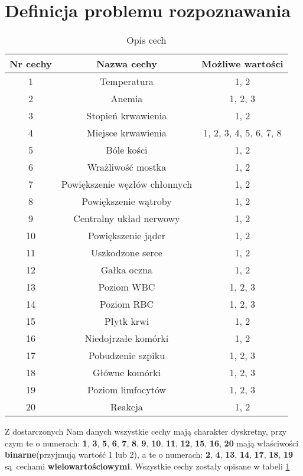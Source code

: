 \section{Definicja problemu rozpoznawania}
	
	\begin{table}[h!]
		\centering
		\begin{tabular}{|| c | c | c ||} 
			\hline
			Nr cechy & Nazwa cechy & Możliwe wartości \\ [0.5ex] 
			\hline\hline
			1 & Temperatura & 1, 2 \\ 
			2 & Anemia & 1, 2, 3 \\
			3 & Stopień krwawienia & 1, 2 \\
			4 & Miejsce krwawienia & 1, 2, 3, 4, 5, 6, 7, 8 \\
			5 & Bóle kości & 1, 2 \\
			6 & Wrażliwość mostka & 1, 2 \\
			7 & Powiększenie węzłów chłonnych & 1, 2 \\
			8 & Powiększenie wątroby & 1, 2 \\
			9 & Centralny układ nerwowy & 1, 2 \\
			10 & Powiększenie jąder & 1, 2 \\
			11 & Uszkodzone serce & 1, 2 \\
			12 & Gałka oczna & 1, 2 \\
			13 & Poziom WBC & 1, 2, 3 \\
			14 & Poziom RBC & 1, 2, 3 \\
			15 & Płytk krwi & 1, 2 \\
			16 & Niedojrzałe komórki & 1, 2 \\
			17 & Pobudzenie szpiku & 1, 2, 3 \\
			18 & Główne komórki & 1, 2, 3 \\
			19 & Poziom limfocytów & 1, 2, 3 \\
			20 & Reakcja & 1, 2 \\ [1ex] 
			\hline
		\end{tabular}
		\caption{Opis cech}
		\label{1}
	\end{table}

Z dostarczonych Nam danych wszystkie cechy mają charakter dyskretny, przy czym te o numerach: \textbf{1}, \textbf{3}, \textbf{5}, \textbf{6}, \textbf{7}, \textbf{8}, \textbf{9}, \textbf{10}, \textbf{11}, \textbf{12}, \textbf{15}, \textbf{16}, \textbf{20} mają właściwości \textbf{binarne}(przyjmują wartość 1 lub 2), a te o numerach: \textbf{2}, \textbf{4}, \textbf{13}, \textbf{14}, \textbf{17}, \textbf{18}, \textbf{19} są cechami \textbf{wielowartościowymi}. Wszystkie cechy zostały opisane w tabeli \ref{1}

